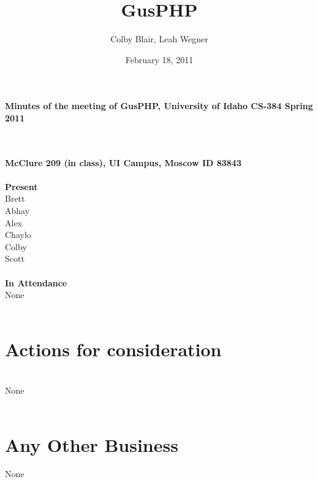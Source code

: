 \documentclass[12pt]{article}
\title{GusPHP}
\date{February 18, 2011}
\author{Colby Blair, Leah Wegner}
\begin{document}
\maketitle
\begin{center}\textbf{Minutes of the meeting of GusPHP, University of Idaho CS-384 Spring 2011} \end{center} \\ \\
\textbf{McClure 209 (in class), UI Campus, Moscow ID 83843} \\ \\
\textbf{Present}\\ 
Brett\\
Abhay\\
Alex\\
Chaylo\\
Colby\\
Scott\\
\\
\textbf{In Attendance}\\
None \\
\\
\section{Actions for consideration} \\
None \\
\\
\section{Any Other Business}
None \\
\\
\end{document}
